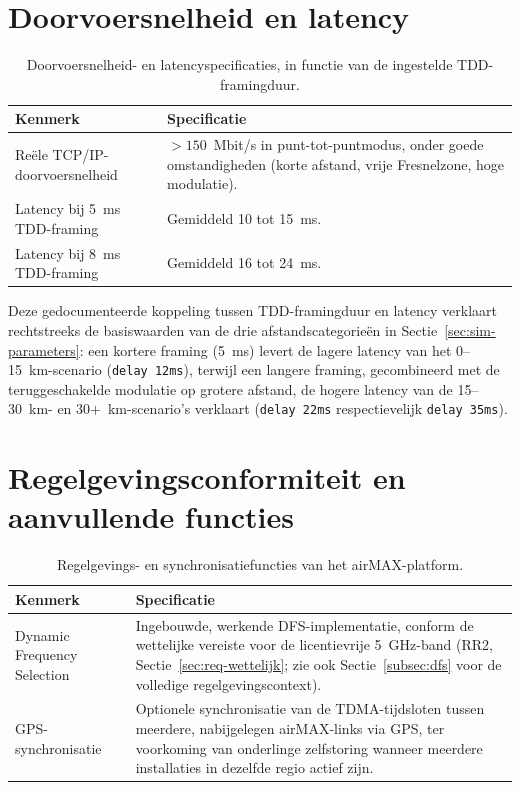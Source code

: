 \section{Doorvoersnelheid en latency}%
\label{sec:app-airmax-prestaties}

\begin{table}[h]
  \centering
  \small
  \begin{tabular}{p{4.0cm}p{9.5cm}}
    \toprule
    \textbf{Kenmerk} & \textbf{Specificatie} \\
    \midrule
    Reële TCP/IP-doorvoersnelheid & $> 150$~Mbit/s in punt-tot-puntmodus, onder goede
      omstandigheden (korte afstand, vrije Fresnelzone, hoge modulatie). \\
    Latency bij 5~ms TDD-framing & Gemiddeld 10 tot 15~ms. \\
    Latency bij 8~ms TDD-framing & Gemiddeld 16 tot 24~ms. \\
    \bottomrule
  \end{tabular}
  \caption{Doorvoersnelheid- en latencyspecificaties, in functie van de ingestelde
  TDD-framingduur.}
  \label{tab:app-airmax-prestaties}
\end{table}

Deze gedocumenteerde koppeling tussen TDD-framingduur en latency verklaart rechtstreeks
de basiswaarden van de drie afstandscategorieën in Sectie~\ref{sec:sim-parameters}: een
kortere framing (5~ms) levert de lagere latency van het 0--15~km-scenario
(\texttt{delay 12ms}), terwijl een langere framing, gecombineerd met de teruggeschakelde
modulatie op grotere afstand, de hogere latency van de 15--30~km- en
30+~km-scenario's verklaart (\texttt{delay 22ms} respectievelijk \texttt{delay 35ms}).

\section{Regelgevingsconformiteit en aanvullende functies}%
\label{sec:app-airmax-regelgeving}

\begin{table}[h]
  \centering
  \small
  \begin{tabular}{p{4.0cm}p{9.5cm}}
    \toprule
    \textbf{Kenmerk} & \textbf{Specificatie} \\
    \midrule
    Dynamic Frequency Selection & Ingebouwde, werkende DFS-implementatie, conform de
      wettelijke vereiste voor de licentievrije 5~GHz-band (RR2,
      Sectie~\ref{sec:req-wettelijk}; zie ook Sectie~\ref{subsec:dfs} voor de volledige
      regelgevingscontext). \\
    GPS-synchronisatie & Optionele synchronisatie van de TDMA-tijdsloten tussen
      meerdere, nabijgelegen airMAX-links via GPS, ter voorkoming van onderlinge
      zelfstoring wanneer meerdere installaties in dezelfde regio actief zijn. \\
    \bottomrule
  \end{tabular}
  \caption{Regelgevings- en synchronisatiefuncties van het airMAX-platform.}
  \label{tab:app-airmax-regelgeving}
\end{table}

